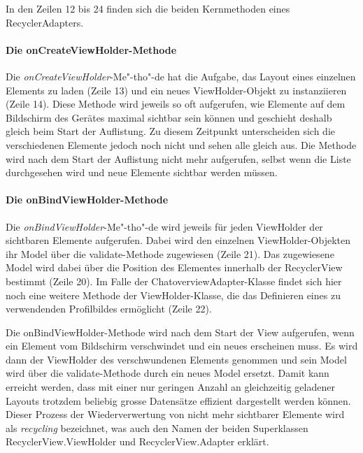 \documentclass[../main.tex]{subfiles}
\begin{document}
	In den Zeilen 12 bis 24 finden sich die beiden Kernmethoden eines RecyclerAdapters.
	
	\paragraph{Die onCreateViewHolder-Methode}
	Die \emph{onCreateViewHolder}-Me"-tho"-de hat die Aufgabe, das Layout eines einzelnen Elements zu laden (Zeile 13) und ein neues ViewHolder-Objekt zu instanziieren (Zeile 14). Diese Methode wird jeweils so oft aufgerufen, wie Elemente auf dem Bildschirm des Gerätes maximal sichtbar sein können und geschieht deshalb gleich beim Start der Auflistung. Zu diesem Zeitpunkt unterscheiden sich die verschiedenen Elemente jedoch noch nicht und sehen alle gleich aus. Die Methode wird nach dem Start der Auflistung nicht mehr aufgerufen, selbst wenn die Liste durchgesehen wird und neue Elemente sichtbar werden müssen.
	
	\paragraph{Die onBindViewHolder-Methode}
	\sloppy
	Die \emph{onBindViewHolder}-Me"-tho"-de \newline wird jeweils für jeden ViewHolder der sichtbaren Elemente aufgerufen. Dabei wird den einzelnen ViewHolder-Objekten ihr Model über die validate-Methode zugewiesen (Zeile 21). Das zugewiesene Model wird dabei über die Position des Elementes innerhalb der RecyclerView bestimmt (Zeile 20). Im Falle der ChatoverviewAdapter-Klasse findet sich hier noch eine weitere Methode der ViewHolder-Klasse, die das Definieren eines zu verwendenden Profilbildes ermöglicht (Zeile 22).
	\fussy
	
	Die onBindViewHolder-Methode wird nach dem Start der View aufgerufen, wenn ein Element vom Bildschirm verschwindet und ein neues erscheinen muss. Es wird dann der ViewHolder des verschwundenen Elements genommen und sein Model wird über die validate-Methode durch ein neues Model ersetzt. Damit kann erreicht werden, dass mit einer nur geringen Anzahl an gleichzeitig geladener Layouts trotzdem beliebig grosse Datensätze effizient dargestellt werden können. Dieser Prozess der Wiederverwertung von nicht mehr sichtbarer Elemente wird als \emph{recycling} bezeichnet, was auch den Namen der beiden Superklassen RecyclerView.ViewHolder und RecyclerView.Adapter erklärt.
	
\end{document}

